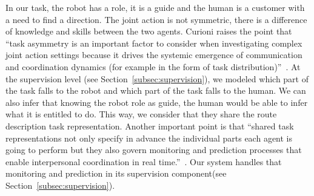 \documentclass[a4paper,11pt,twoside]{StyleThese}
\begin{document}
In our task, the robot has a role, it is a guide and the human is a customer with a need to find a direction. The joint action is not symmetric, there is a difference of knowledge and skills between the two agents. Curioni \etal{} raises the point that ``task asymmetry is an important factor to consider when investigating complex joint action settings because it drives the systemic emergence of communication and coordination dynamics (for example in the form of task distribution)''~\cite[p.~11]{curioni_2017_joint}. At the supervision level (see Section~\ref{subsec:supervision}), we modeled which part of the task falls to the robot and which part of the task falls to the human. We can also infer that knowing the robot role as guide, the human would be able to infer what it is entitled to do. This way, we consider that they share the route description task representation. 
Another important point is that ``shared task representations not only specify in advance the individual parts each agent is going to perform but they also govern monitoring and prediction processes that enable interpersonal coordination in real time.''~\cite[p.~65]{knoblich_2011_joint}. Our system handles that monitoring and prediction in its supervision component(see Section~\ref{subsec:supervision}).
%
%
%
%
\end{document}
